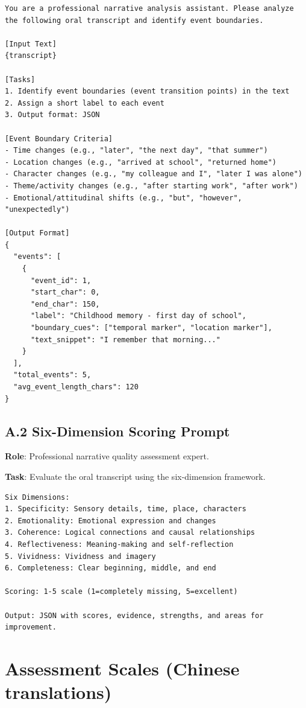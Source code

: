 \documentclass[11pt]{article}
\begin{document}
\begin{verbatim}
You are a professional narrative analysis assistant. Please analyze 
the following oral transcript and identify event boundaries.

[Input Text]
{transcript}

[Tasks]
1. Identify event boundaries (event transition points) in the text
2. Assign a short label to each event
3. Output format: JSON

[Event Boundary Criteria]
- Time changes (e.g., "later", "the next day", "that summer")
- Location changes (e.g., "arrived at school", "returned home")
- Character changes (e.g., "my colleague and I", "later I was alone")
- Theme/activity changes (e.g., "after starting work", "after work")
- Emotional/attitudinal shifts (e.g., "but", "however", "unexpectedly")

[Output Format]
{
  "events": [
    {
      "event_id": 1,
      "start_char": 0,
      "end_char": 150,
      "label": "Childhood memory - first day of school",
      "boundary_cues": ["temporal marker", "location marker"],
      "text_snippet": "I remember that morning..."
    }
  ],
  "total_events": 5,
  "avg_event_length_chars": 120
}
\end{verbatim}

\subsection*{A.2 Six-Dimension Scoring Prompt}

\textbf{Role}: Professional narrative quality assessment expert.

\textbf{Task}: Evaluate the oral transcript using the six-dimension framework.

\begin{verbatim}
Six Dimensions:
1. Specificity: Sensory details, time, place, characters
2. Emotionality: Emotional expression and changes
3. Coherence: Logical connections and causal relationships
4. Reflectiveness: Meaning-making and self-reflection
5. Vividness: Vividness and imagery
6. Completeness: Clear beginning, middle, and end

Scoring: 1-5 scale (1=completely missing, 5=excellent)

Output: JSON with scores, evidence, strengths, and areas for improvement.
\end{verbatim}

\section{Assessment Scales (Chinese translations)}
\label{app:scales}
\end{document}
